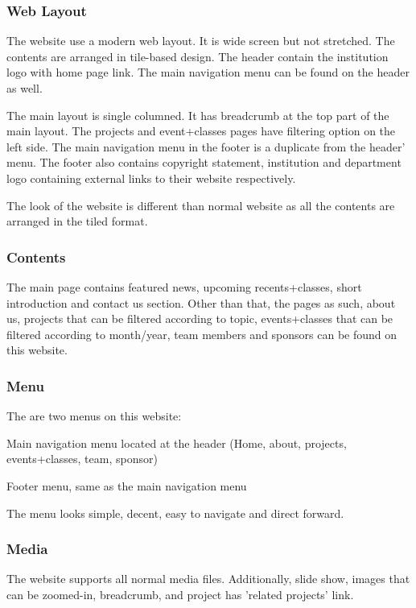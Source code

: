 \subsubsection*{Web Layout}
The website use a modern web layout. It is wide screen but not stretched. The contents are arranged in tile-based design. The header contain the institution logo with home page link. The main navigation menu can be found on the header as well.

The main layout is single columned. It has breadcrumb at the top part of the main layout. The projects and event+classes pages have filtering option on the left side. The main navigation menu in the footer is a duplicate from the header' menu. The footer also contains copyright statement, institution and department logo containing external links to their website respectively.

The look of the website is different than normal website as all the contents are arranged in the tiled format.

\subsubsection*{Contents}
The main page contains featured news, upcoming recents+classes, short introduction and contact us section. Other than that, the pages as such, about us, projects that can be filtered according to topic, events+classes that can be filtered according to month/year, team members and sponsors can be found on this website.

\subsubsection*{Menu}
The are two menus on this website:
\begin{itemize*}
\item Main navigation menu located at the header (Home, about, projects, events+classes, team, sponsor)
\item Footer menu, same as the main navigation menu
\end{itemize*}

The menu looks simple, decent, easy to navigate and direct forward.

\subsubsection*{Media}
The website supports all normal media files. Additionally, slide show, images that can be zoomed-in, breadcrumb, and project has 'related projects' link.

